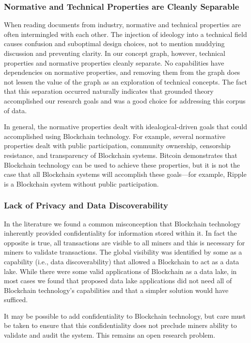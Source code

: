\subsubsection{Normative and Technical Properties are Cleanly Separable}
When reading documents from industry, normative and technical properties are often intermingled with each other.
The injection of ideology into a technical field causes confusion and suboptimal design choices, not to mention muddying discussion and preventing clarity.
In our concept graph, however, technical properties and normative properties cleanly separate.
No capabilities have dependencies on normative properties, and removing them from the graph does not lessen the value of the graph as an exploration of technical concepts. 
The fact that this separation occurred naturally indicates that grounded theory accomplished our research goals and was a good choice for addressing this corpus of data.

In general, the normative properties dealt with idealogical-driven goals that could accomplished using Blockchain technology.
For example, several normative properties dealt with public participation, community ownership, censorship resistance, and transparency of Blockchain systems.
Bitcoin demonstrates that Blockchain technology can be used to achieve these properties, but it is not the case that all Blockchain systems will accomplish these goals---for example, Ripple is a Blockchain system without public participation.

\subsubsection{Lack of Privacy and Data Discoverability}
In the literature we found a common misconception that Blockchain technology inherently provided confidentiality for information stored within it.
In fact the opposite is true, all transactions are visible to all miners and this is necessary for miners to validate transactions.
The global visibility was identified by some as a capability (i.e., data discoverability) that allowed a Blockchain to act as a data lake.
While there were some valid applications of Blockchain as a data lake, in most cases we found that proposed data lake applications did not need all of Blockchain technology's capabilities and that a simpler solution would have sufficed.

It may be possible to add confidentiality to Blockchain technology, but care must be taken to ensure that this confidentiality does not preclude miners ability to validate and audit the system.
This remains an open research problem.


